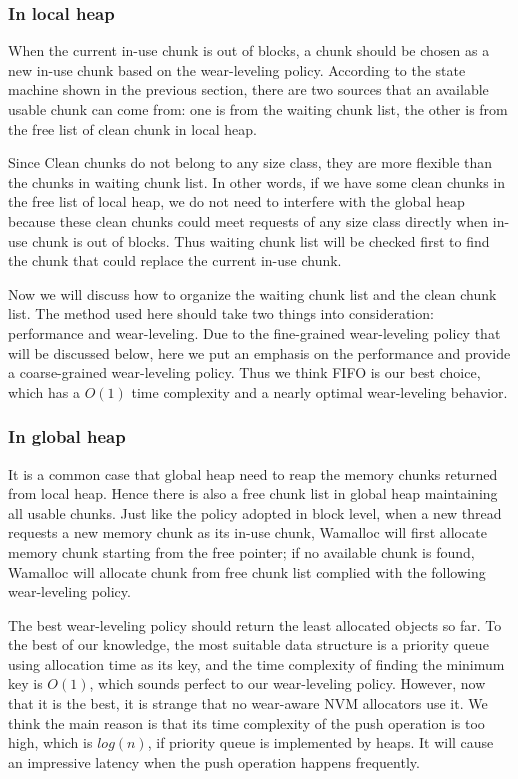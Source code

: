 \documentclass{vldb}
\begin{document}
\subsubsection{In local heap}

When the current in-use chunk is out of blocks, 
a chunk should be chosen as a new in-use chunk based on the wear-leveling policy.
According to the state machine shown in the previous section,
there are two sources that an available usable chunk can come from:
one is from the waiting chunk list, the other is from the free list of clean chunk in local heap.

Since Clean chunks do not belong to any size class, they are more flexible than the chunks in waiting chunk list.
In other words, if we have some clean chunks in the free list of local heap, 
we do not need to interfere with the global heap
because these clean chunks could meet requests of any size class directly when in-use chunk is out of blocks.
Thus waiting chunk list will be checked first to find the chunk that could replace the current in-use chunk.

Now we will discuss how to organize the waiting chunk list and the clean chunk list.
The method used here should take two things into consideration:
performance and wear-leveling.
Due to the fine-grained wear-leveling policy that will be discussed below,
here we put an emphasis on the performance and provide a coarse-grained wear-leveling policy.
Thus we think FIFO is our best choice, which has a $O(1)$ time complexity and a nearly optimal wear-leveling behavior.

\subsubsection{In global heap}
It is a common case that global heap need to reap the memory chunks returned from local heap.
Hence there is also a free chunk list in global heap maintaining all usable chunks. 
Just like the policy adopted in block level, 
when a new thread requests a new memory chunk as its in-use chunk,
Wamalloc will first allocate memory chunk starting from the free pointer; 
if no available chunk is found, Wamalloc will allocate chunk from free chunk list complied with the following wear-leveling policy.

The best wear-leveling policy should return the least allocated objects so far. 
To the best of our knowledge, the most suitable data structure is a priority queue using allocation time as its key,
and the time complexity of finding the minimum key is $O(1)$, which sounds perfect to our wear-leveling policy.
However, now that it is the best, it is strange that no wear-aware NVM allocators use it.
We think the main reason is that its time complexity of the push operation is too high, which is $log(n)$, if priority queue is implemented by heaps. 
It will cause an impressive latency when the push operation happens frequently.
\end{document}
